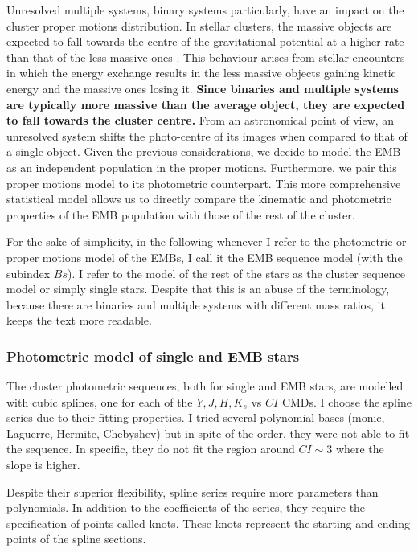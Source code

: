 Unresolved multiple systems, binary systems particularly, have an impact on the cluster proper motions distribution. In stellar clusters, the massive objects are expected to fall towards the centre of the gravitational potential at a higher rate than that of the less massive ones \textbf{\cite[see for example][p. 556]{Binney2008}}. This behaviour arises from stellar encounters in which the energy exchange results in the less massive objects gaining kinetic energy and the massive ones losing it. \textbf{Since binaries and multiple systems are typically more massive than the average object, they are expected to fall towards the cluster centre.} From an astronomical point of view, an unresolved system shifts the photo-centre of its images when compared to that of a single object. Given the previous considerations, we decide to model the EMB as an independent population in the proper motions. Furthermore, we pair this proper motions model to its photometric counterpart. This more comprehensive statistical model allows us to directly compare the kinematic and photometric properties of the EMB population with those of the rest of the cluster. 

For the sake of simplicity, in the following whenever I refer to the photometric or proper motions model of the EMBs, I call it the EMB sequence model (with the subindex $Bs$). I refer to the model of the rest of the stars as the cluster sequence model or simply single stars. Despite that this is an abuse of the terminology, because there are binaries and multiple systems with different mass ratios, it keeps the text more readable.

\subsubsection{Photometric model of single and EMB stars}

The cluster photometric sequences, both for single and EMB stars, are modelled with cubic splines, one for each of the $Y,J,H,K_s$ vs $CI$ CMDs. I choose the spline series due to their fitting properties. I tried several polynomial bases (monic, Laguerre, Hermite, Chebyshev) but in spite of the order, they were not able to fit the sequence. In specific, they do not fit the region around $CI \sim 3$ where the slope is higher. 

Despite their superior flexibility, spline series require more parameters than polynomials. In addition to the coefficients of the series, they require the specification of points called knots. These knots represent the starting and ending points of the spline sections. 

